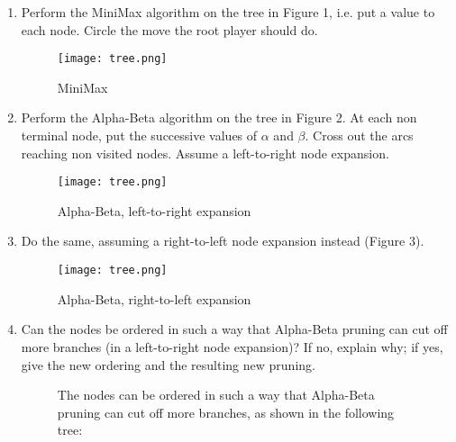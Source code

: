 \begin{enumerate}
    \item Perform the MiniMax algorithm on the tree in Figure 1, i.e. put a value to each node. Circle the move the root player should do.
      \begin{figure}[!ht]
      \begin{framed}
	  \centering
	  \texttt{[image: tree.png]}
	  \caption{MiniMax}
      \end{framed}
      \end{figure}
      \FloatBarrier
    \item Perform the Alpha-Beta algorithm on the tree in Figure 2. At each non terminal node, put the successive values of $\alpha$ and $\beta$. Cross out the arcs reaching non visited nodes. Assume a left-to-right node expansion.
      \begin{figure}[!ht]
      \begin{framed}
	  \centering
	  \texttt{[image: tree.png]}
	  \caption{Alpha-Beta, left-to-right expansion}
      \end{framed}
      \end{figure}
      \FloatBarrier
    \item Do the same, assuming a right-to-left node expansion instead (Figure 3).
      \begin{figure}[!ht]
      \begin{framed}
	  \centering
	  \texttt{[image: tree.png]}
	  \caption{Alpha-Beta, right-to-left expansion}
      \end{framed}
      \end{figure}
      \FloatBarrier
\newpage
    \item Can the nodes be ordered in such a way that Alpha-Beta pruning can cut off more branches (in a left-to-right node expansion)? If no, explain why; if yes, give the new ordering and the resulting new pruning.
      \begin{figure}[!ht]
      \begin{framed}
        The nodes can be ordered in such a way that Alpha-Beta pruning can
        cut off more branches, as shown in the following tree:


\end{framed}
\end{figure}
\end{enumerate}

